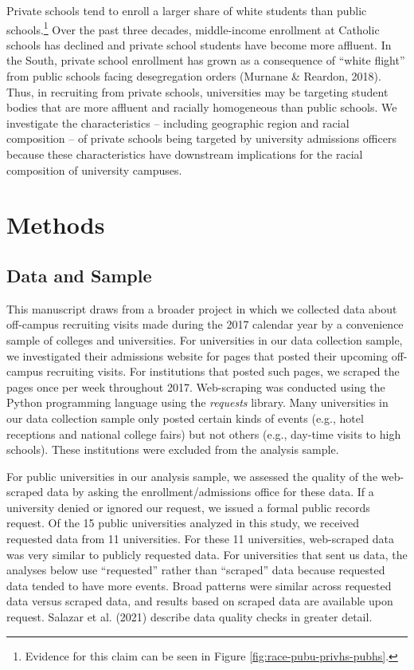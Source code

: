 \documentclass[
  12pt,
]{article}
\begin{document}
Private schools tend to enroll a larger share of white students than public schools.\footnote{Evidence for this claim can be seen in Figure \ref{fig:race-pubu-privhs-pubhs}.} Over the past three decades, middle-income enrollment at Catholic schools has declined and private school students have become more affluent. In the South, private school enrollment has grown as a consequence of ``white flight'' from public schools facing desegregation orders (Murnane \& Reardon, 2018). Thus, in recruiting from private schools, universities may be targeting student bodies that are more affluent and racially homogeneous than public schools. We investigate the characteristics -- including geographic region and racial composition -- of private schools being targeted by university admissions officers because these characteristics have downstream implications for the racial composition of university campuses.

\section{Methods}\label{methods}

\subsection{Data and Sample}\label{data-and-sample}

This manuscript draws from a broader project in which we collected data about off-campus recruiting visits made during the 2017 calendar year by a convenience sample of colleges and universities. For universities in our data collection sample, we investigated their admissions website for pages that posted their upcoming off-campus recruiting visits. For institutions that posted such pages, we scraped the pages once per week throughout 2017. Web-scraping was conducted using the Python programming language using the \emph{requests} library. Many universities in our data collection sample only posted certain kinds of events (e.g., hotel receptions and national college fairs) but not others (e.g., day-time visits to high schools). These institutions were excluded from the analysis sample.

For public universities in our analysis sample, we assessed the quality of the web-scraped data by asking the enrollment/admissions office for these data. If a university denied or ignored our request, we issued a formal public records request. Of the 15 public universities analyzed in this study, we received requested data from 11 universities. For these 11 universities, web-scraped data was very similar to publicly requested data. For universities that sent us data, the analyses below use ``requested'' rather than ``scraped'' data because requested data tended to have more events. Broad patterns were similar across requested data versus scraped data, and results based on scraped data are available upon request. Salazar et al. (2021) describe data quality checks in greater detail.
\end{document}
